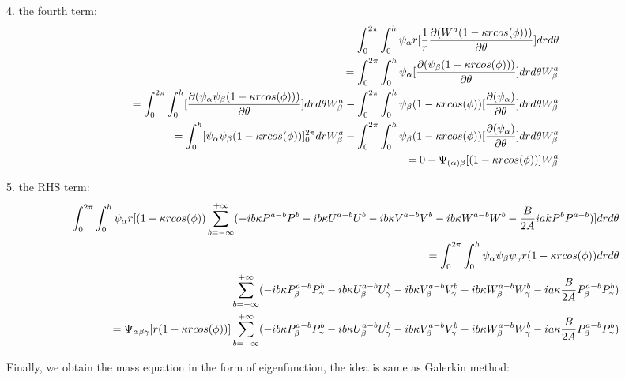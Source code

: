 \documentclass{Note}
\begin{document}
4. the fourth term:
\begin{equation}
\begin{aligned}
\int_0^{2\pi}\int_0^h \psi_\alpha r [{1\over r}{\partial(W^a (1-\kappa r cos(\phi)))\over \partial \theta}] dr d\theta\\
=\int_0^{2\pi}\int_0^h \psi_\alpha  [{\partial(\psi_\beta (1-\kappa r cos(\phi)))\over \partial \theta}] dr d\theta W_\beta^a\\
=\int_0^{2\pi}\int_0^h  [{\partial(\psi_\alpha  \psi_\beta (1-\kappa r cos(\phi)))\over \partial \theta}] dr d\theta W_\beta^a
-\int_0^{2\pi}\int_0^h  \psi_\beta (1-\kappa r cos(\phi))[{\partial(\psi_\alpha )\over \partial \theta}] dr d\theta W_\beta^a\\
=\int_0^h  [\psi_\alpha  \psi_\beta (1-\kappa r cos(\phi))]_0^{2\pi} dr W_\beta^a
-\int_0^{2\pi}\int_0^h  \psi_\beta (1-\kappa r cos(\phi))[{\partial(\psi_\alpha )\over \partial \theta}] dr d\theta W_\beta^a\\
=0-\Psi_{(\alpha)\beta}[ (1-\kappa r cos(\phi))]W_\beta^a
\end{aligned}
\end{equation}


5. the RHS term:
\begin{equation}
\begin{aligned}
\int_0^{2\pi}\int_0^h \psi_\alpha r [(1-\kappa r cos(\phi))\sum_{b=-\infty}^{+\infty}(-ib\kappa P^{a-b} P^{b} -ib\kappa U^{a-b} U^{b}-ib\kappa V^{a-b} V^{b}-ib\kappa W^{a-b} W^{b}  - {B\over {2A}}iakP^bP^{a-b})] dr d\theta\\
=\int_0^{2\pi}\int_0^h \psi_\alpha \psi_\beta \psi_\gamma r  (1-\kappa r cos(\phi)) drd\theta \\  \sum_{b=-\infty}^{+\infty}(-ib\kappa P_\beta^{a-b} P_\gamma^{b}-ib\kappa U_\beta^{a-b} U_\gamma^{b}-ib\kappa V_\beta^{a-b} V_\gamma^{b}-ib\kappa  W_\beta^{a-b} W_\gamma^{b}-ia\kappa  {B\over {2A}}P_\beta^{a-b}P_\gamma^{b})\\
=\Psi_{\alpha\beta\gamma}[r(1-\kappa r cos(\phi))] \sum_{b=-\infty}^{+\infty}(-ib\kappa P_\beta^{a-b} P_\gamma^{b}-ib\kappa U_\beta^{a-b} U_\gamma^{b}-ib\kappa V_\beta^{a-b} V_\gamma^{b}-ib\kappa  W_\beta^{a-b} W_\gamma^{b}-ia\kappa  {B\over {2A}}P_\beta^{a-b}P_\gamma^{b})\\
\end{aligned}
\end{equation}

Finally, we obtain the mass equation in the form of eigenfunction, the idea is same as Galerkin method:
\end{document}
